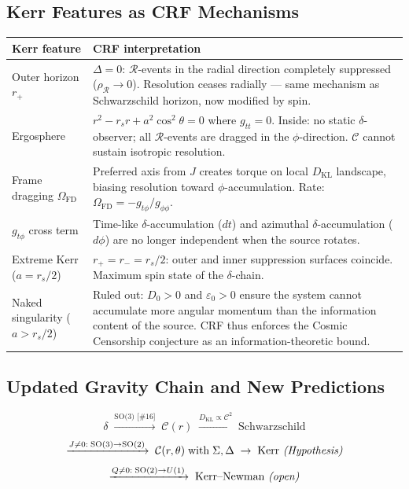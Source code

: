 \documentclass[12pt, a4paper]{article}
\begin{document}
\subsection{Kerr Features as CRF Mechanisms}

\begin{center}
\renewcommand{\arraystretch}{1.3}
\begin{tabular}{p{3cm} p{9cm}}
\toprule
\textbf{Kerr feature} & \textbf{CRF interpretation} \\
\midrule
Outer horizon $r_+$ & $\Delta = 0$: $\mathcal{R}$-events in the radial direction completely suppressed ($\rho_\mathcal{R}\to 0$). Resolution ceases radially --- same mechanism as Schwarzschild horizon, now modified by spin. \\
Ergosphere & $r^2 - r_sr + a^2\cos^2\theta = 0$ where $g_{tt} = 0$. Inside: no static $\delta$-observer; all $\mathcal{R}$-events are dragged in the $\phi$-direction. $\mathcal{C}$ cannot sustain isotropic resolution. \\
Frame dragging $\Omega_{\mathrm{FD}}$ & Preferred axis from $J$ creates torque on local $D_{\mathrm{KL}}$ landscape, biasing resolution toward $\phi$-accumulation. Rate: $\Omega_{\mathrm{FD}} = -g_{t\phi}/g_{\phi\phi}$. \\
$g_{t\phi}$ cross term & Time-like $\delta$-accumulation ($dt$) and azimuthal $\delta$-accumulation ($d\phi$) are no longer independent when the source rotates. \\
Extreme Kerr ($a = r_s/2$) & $r_+ = r_- = r_s/2$: outer and inner suppression surfaces coincide. Maximum spin state of the $\delta$-chain. \\
Naked singularity ($a > r_s/2$) & Ruled out: $D_0 > 0$ and $\varepsilon_0 > 0$ ensure the system cannot accumulate more angular momentum than the information content of the source. CRF thus enforces the Cosmic Censorship conjecture as an information-theoretic bound. \\
\bottomrule
\end{tabular}
\end{center}

\subsection{Updated Gravity Chain and New Predictions}

\begin{derivedbox}[title={Gravity Chain: Schwarzschild $\to$ Kerr $\to$ Kerr--Newman}]
\[
  \delta
  \;\xrightarrow{\text{SO(3) [\#16]}}\;
  \mathcal{C}(r)
  \;\xrightarrow{D_{\mathrm{KL}}\propto\mathcal{C}^2}\;
  \text{Schwarzschild}
\]
\[
  \xrightarrow{J\neq 0:\;\mathrm{SO}(3)\to\mathrm{SO}(2)}\;
  \mathcal{C}(r,\theta)\;\text{with}\;\Sigma,\Delta
  \;\to\; \text{Kerr \emph{(Hypothesis)}}
\]
\[
  \xrightarrow{Q\neq 0:\;\mathrm{SO}(2)\to U(1)}\;
  \text{Kerr--Newman \emph{(open)}}
\]
\end{derivedbox}
\end{document}
